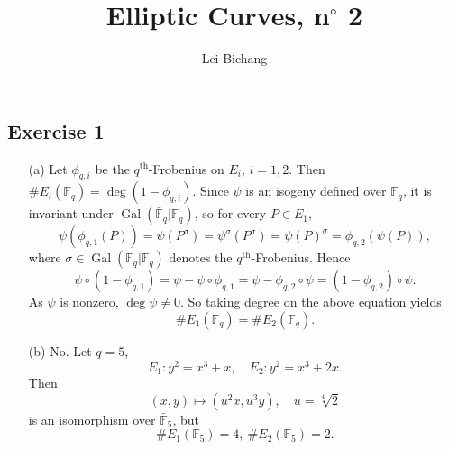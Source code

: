 \documentclass{article}
\title{Elliptic Curves, n$^\circ$ 2}
\author{Lei Bichang}
\theoremstyle{definition}
\theoremstyle{remark}
\newcommand{\F}{\mathbb{F}}
\DeclareMathOperator{\gal}{Gal}
\begin{document}
\maketitle


\subsection*{Exercise 1}

\begin{enumerate}
    \item [(a)] Let $\phi_{q, i}$ be the $q^{\mathrm{th}}$-Frobenius on $E_i$, $i = 1, 2$.
    Then $\# E_i(\F_q) = \deg (1 - \phi_{q, i})$.
    Since $\psi$ is an isogeny defined over $\F_q$, it is invariant under $\gal(\bar{ \F}_q|\F_q)$,
    so for every $P\in E_1$,\[\psi(\phi_{q,1}(P)) = \psi(P^{\sigma}) = \psi^\sigma(P^\sigma) = \psi(P)^\sigma = \phi_{q, 2}(\psi(P)),\]
    where $\sigma \in \gal(\bar{ \F}_q|\F_q)$ denotes the $q^{\mathrm{th}}$-Frobenius.
    Hence \[\psi\circ (1 - \phi_{q, 1}) = \psi - \psi\circ\phi_{q, 1} = \psi - \phi_{q, 2}\circ\psi = (1 - \phi_{q, 2})\circ\psi.\]
    As $\psi$ is nonzero, $\deg\psi\ne 0$.
    So taking degree on the above equation yields\[\# E_1(\F_q) = \# E_2(\F_q).\]
    
    \item [(b)]
    No. Let $q = 5$, \[E_1 : y^2 = x^3 + x,\quad E_2  : y^2 = x^3 + 2x.\]
    Then \[(x, y)\mapsto (u^2x, u^3y),\quad u = \sqrt[4]{2}\]
    is an isomorphism over $\bar{\F}_5$,
    but \[\# E_1(\F_5) = 4,\ \# E_2(\F_5) = 2.\]



\end{enumerate}
\end{document}

